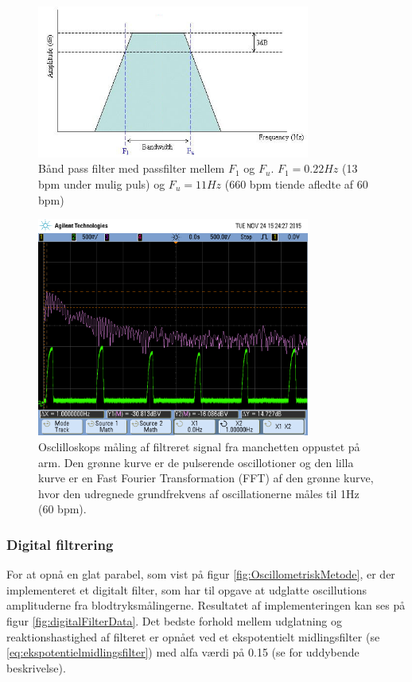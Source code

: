 \begin{figure}[H]
	\centering
	\includegraphics[trim={0 0 0 1.5cm},clip, width=0.8\textwidth]{billeder/BandPass_filter.JPG}
	\caption{Bånd pass filter med passfilter mellem $F_1$ og $F_u$. $F_1=0.22Hz$ (13 bpm under mulig puls) og $F_u=11Hz$ (660 bpm tiende afledte af 60 bpm) }\label{fig:BandPassFilter}
\end{figure}

\begin{figure}[H]
	\centering
	\includegraphics[trim={0 2.5cm 0 1.5cm},clip, width=0.8\textwidth]{billeder/filteredPulseSignalWithFFT.png}
	\caption{Osclilloskops måling af filtreret signal fra manchetten oppustet på arm. Den grønne kurve er de pulserende oscillotioner og den lilla kurve er en Fast Fourier Transformation (FFT) af den grønne kurve, hvor den udregnede grundfrekvens af oscillationerne måles til 1Hz (60 bpm).}\label{fig:filteredPulseSignalWithFFT}
\end{figure}

\subsubsection{Digital filtrering}
For at opnå en glat parabel, som vist på  figur \ref{fig:OscillometriskMetode}, er der implementeret et digitalt filter, som har til opgave at udglatte oscillutions amplituderne fra blodtryksmålingerne. Resultatet af implementeringen kan ses på figur \ref{fig:digitalFilterData}. Det bedste forhold mellem udglatning og reaktionshastighed af filteret er opnået ved et ekspotentielt midlingsfilter (se \ref{eq:ekspotentielmidlingsfilter}) med alfa værdi på 0.15 (se  for uddybende beskrivelse).  

